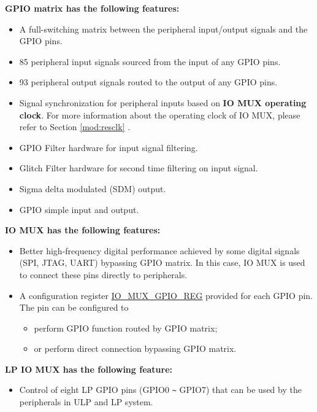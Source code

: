 \documentclass[main\_\_EN.tex]{subfiles}
\begin{document}
\textbf{GPIO matrix has the following features:}

\begin{itemize}
\item A full-switching matrix between the peripheral input/output signals and the GPIO pins.
\item 85 peripheral input signals sourced from the input of any GPIO pins.
\item 93 peripheral output signals routed to the output of any GPIO pins.
\item Signal synchronization for peripheral inputs based on \textbf{IO MUX operating clock}. For more information about the operating clock of IO MUX, please refer to Section \ref{mod:resclk} \textit{}.
\item GPIO Filter hardware for input signal filtering.
\item Glitch Filter hardware for second time filtering on input signal.  
\item Sigma delta modulated (SDM) output.
\item GPIO simple input and output.
\end{itemize}

\textbf{IO MUX has the following features:}

\begin{itemize}
\item Better high-frequency digital performance achieved by some digital signals (SPI, JTAG, UART) bypassing GPIO matrix. In this case, IO MUX is used to connect these pins directly to peripherals. 
\item A configuration register \hyperref[regdesc:IOMUXGPIONREG]{IO\_MUX\_GPIO\_REG} provided for each GPIO pin. The pin can be configured to
    \begin{itemize}
        \item perform GPIO function routed by GPIO matrix;
        \item or perform direct connection bypassing GPIO matrix.
    \end{itemize}

\end{itemize}

\textbf{LP IO MUX has the following feature:}

\begin{itemize}
    \item Control of eight LP GPIO pins (GPIO0 \verb+~+ GPIO7) that can be used by the peripherals in ULP and LP system.
\end{itemize}
\end{document}
